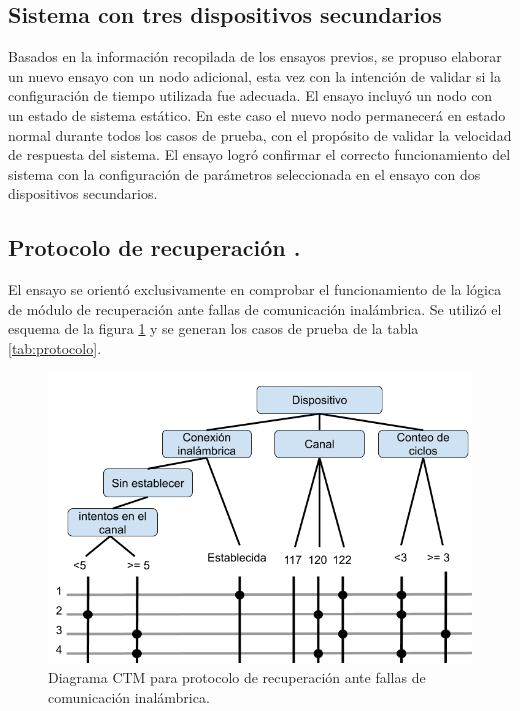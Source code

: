 \subsection{Sistema con tres dispositivos secundarios}

Basados en la información recopilada de los ensayos previos, se propuso elaborar un nuevo ensayo con un nodo adicional, esta vez con la intención de validar si la configuración de tiempo utilizada fue adecuada. El ensayo incluyó un nodo con un estado de sistema estático. En este caso el nuevo nodo permanecerá en estado normal durante todos los casos de prueba, con el propósito de validar la velocidad de respuesta del sistema. El ensayo logró confirmar el correcto funcionamiento del sistema con la configuración de parámetros seleccionada en el ensayo con dos dispositivos secundarios.

\subsection{Protocolo de recuperación .}

El ensayo se orientó exclusivamente en comprobar el funcionamiento de la lógica de módulo de recuperación ante fallas de comunicación inalámbrica. Se utilizó el esquema de la figura \ref{fig:ctm_protocolo} y se generan los casos de prueba de la tabla \ref{tab:protocolo}.


\begin{figure}[ht]
	\centering
	\includegraphics[scale=.4]{./Figures/Capitulo4/CTM_PROTOCOLO.png}
	\caption{Diagrama CTM para protocolo de recuperación ante fallas de comunicación inalámbrica.}
	\label{fig:ctm_protocolo}
\end{figure}


